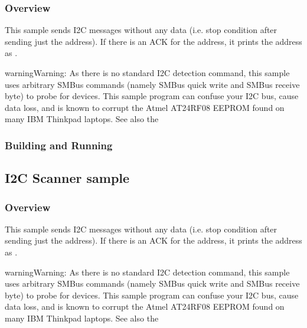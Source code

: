 \documentclass[letterpaper,10pt,english]{sphinxmanual}
\begin{document}
\subsubsection{Overview}
\label{\detokenize{samples/drivers/ds6_scanner/README:overview}}
This sample sends I2C messages without any data (i.e. stop condition
after sending just the address). If there is an ACK for the
address, it prints the address as .

\begin{sphinxadmonition}{warning}{Warning:}
As  there  is  no  standard I2C detection command, this sample
uses arbitrary SMBus commands (namely SMBus quick write and SMBus
receive byte) to probe for devices.  This sample program can confuse
your I2C bus, cause data loss, and is known to corrupt
the Atmel AT24RF08 EEPROM found on many IBM Thinkpad laptops.
See also the 
\end{sphinxadmonition}


\subsubsection{Building and Running}
\label{\detokenize{samples/drivers/ds6_scanner/README:building-and-running}}

\subsection{I2C Scanner sample}
\label{\detokenize{samples/drivers/i2c_scanner/README:i2c-scanner-sample}}\label{\detokenize{samples/drivers/i2c_scanner/README:i2c-scanner}}\label{\detokenize{samples/drivers/i2c_scanner/README::doc}}

\subsubsection{Overview}
\label{\detokenize{samples/drivers/i2c_scanner/README:overview}}
This sample sends I2C messages without any data (i.e. stop condition
after sending just the address). If there is an ACK for the
address, it prints the address as .

\begin{sphinxadmonition}{warning}{Warning:}
As  there  is  no  standard I2C detection command, this sample
uses arbitrary SMBus commands (namely SMBus quick write and SMBus
receive byte) to probe for devices.  This sample program can confuse
your I2C bus, cause data loss, and is known to corrupt
the Atmel AT24RF08 EEPROM found on many IBM Thinkpad laptops.
See also the 
\end{sphinxadmonition}
\end{document}
